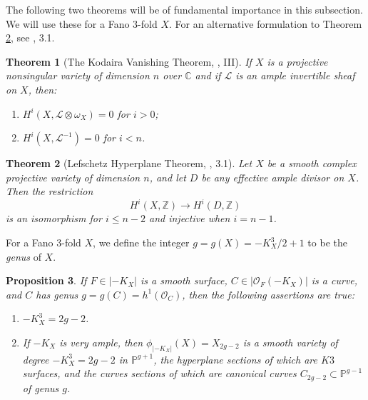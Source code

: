 \documentclass[11pt]{amsart}
\theoremstyle{plain}
\newtheorem{theorem}{Theorem}[section]
\newtheorem{proposition}[theorem]{Proposition}
\theoremstyle{definition}
\theoremstyle{expl}
\begin{document}
The following two theorems will be of fundamental importance in this subsection. We will use these for a Fano $3$-fold $X$. For an alternative formulation to Theorem \ref{C}, see \cite{Laz}, 3.1.
\begin{theorem}[The Kodaira Vanishing Theorem, \cite{Hartshorne}, III] If $X$ is a projective nonsingular variety of dimension $n$ over $\mathbb{C}$ and if $\mathcal{L}$ is an ample invertible sheaf on $X$, then: 
\begin{enumerate}
    \item[a)] $H^i(X, \mathcal{L}\otimes \omega_X) =0$ for $i>0$;
    \item[b)] $H^i(X,\mathcal{L}^{-1})=0$ for $i<n$.
\end{enumerate}
\end{theorem}
\begin{theorem}[Lefschetz Hyperplane Theorem, \cite{Laz}, 3.1]
\label{C}
    Let $X$ be a smooth complex projective variety of dimension $n$, and let $D$ be any effective ample divisor on $X$. Then the restriction 
    \[
    H^i(X,\mathbb{Z}) \rightarrow H^i(D,\mathbb{Z})
    \]
    is an isomorphism for $i\leq n-2$ and injective when $i=n-1$.
\end{theorem}

For a Fano $3$-fold $X$, we define the integer $g=g(X)= -K_X^3/2+1 $ to be the \textit{genus} of $X$.
\begin{proposition}
\label{A}
    If $F \in |-K_X|$ is a smooth surface, $C \in |\mathcal{O}_F(-K_X)|$ is a curve, and $C$ has genus $g=g(C) = h^1(\mathcal{O}_C)$, then the following assertions are true:
    \begin{enumerate}
        \item[(i)] $-K_{X}^3 = 2g-2 $.
        \item[(ii)] If $-K_X$ is very ample, then $\phi_{|-K_X|}(X)= X_{2g-2}$ is a smooth variety of degree $-K_{X}^3 = 2g-2$ in $\mathbb{P}^{g+1}$, the hyperplane sections of which are $K3$ surfaces, and the curves sections of which are canonical curves $C_{2g-2} \subset \mathbb{P}^{g-1}$ of genus $g$.
    \end{enumerate}
\end{proposition}
\end{document}
